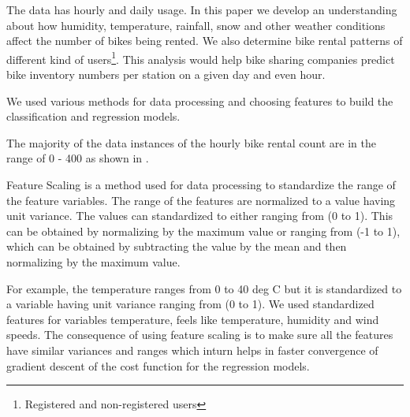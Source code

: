 \documentclass[12pt]{article}
\newcommand{\figwidth}{5in}
\begin{document}

The data has hourly and daily usage. In this paper we develop an understanding
about how humidity, temperature, rainfall, snow and other weather conditions
affect the number of bikes being rented. We also determine bike rental patterns
of different kind of users\footnote{Registered and non-registered users}. This
analysis would help bike sharing companies predict bike inventory numbers per
station on a given day and even hour.



We used various methods for data processing and choosing features to build the
classification and regression models.

The majority of the data instances of the hourly bike rental count are in the
range of 0 - 400 as shown in .

\ddfigure{\figwidth}{freq-histogram}{Bike Rentals Histogram}



Feature Scaling is a method used for data processing to standardize the range
of the feature variables. The range of the features are normalized to a value
having unit variance. The values can standardized to either ranging from (0 to
1).  This can be obtained by normalizing by the maximum value or ranging from
(-1 to 1), which can be obtained by subtracting the value by the mean and then
normalizing by the maximum value.

For example, the temperature ranges from 0 to 40 deg C but it is standardized
to a variable having unit variance ranging from (0 to 1). We used standardized
features for variables temperature, feels like temperature, humidity and wind
speeds. The consequence of using feature scaling is to make sure all the
features have similar variances and ranges which inturn helps in faster
convergence of gradient descent of the cost function for the regression models.

\end{document}
